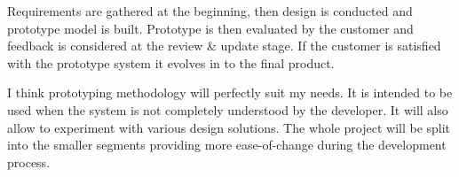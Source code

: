 \documentclass[]{report}
\begin{document}
Requirements are gathered at the beginning, then design is conducted and prototype model is built. Prototype is then evaluated by the customer and feedback is considered at the review \& update stage. If the customer is satisfied with the prototype system it evolves in to the final product. 

I think prototyping methodology will perfectly suit my needs. It is intended to be used when the system is not completely understood by the developer. It will also allow to experiment with various design solutions. The whole project will be split into the smaller segments providing more ease-of-change during the development process. 



\end{document}

